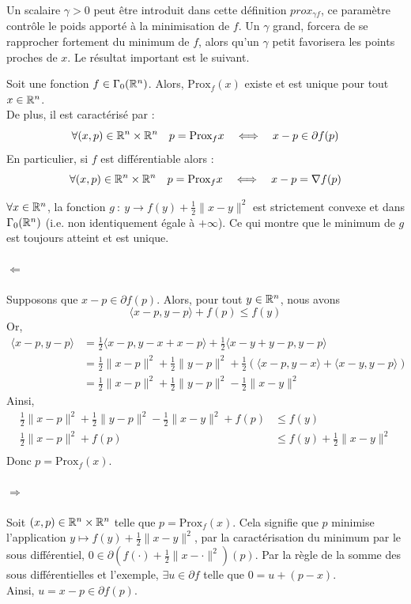 \documentclass[a4paper,12pt]{article}
\newcommand{\prox}{\text{Prox}}
\begin{document}
Un scalaire $\gamma >0 $ peut être introduit dans cette définition $prox_{\gamma f}$, ce paramètre contrôle le poids apporté à la minimisation de $f$. Un $\gamma$ grand, forcera de se rapprocher fortement du minimum de $f$, alors qu'un $\gamma$ petit favorisera les points proches de $x$. Le résultat important est le suivant. 
\begin{propriete}
Soit une fonction $f\in\Gamma_0(\mathbb{R}^n)$. Alors, $\prox_f(x)$ existe et est unique pour tout $x\in\mathbb{R}^n$.\\
De plus, il est caractérisé par : 
$$
\forall (x,p)\in \RR^n\times\RR^n\quad p=\prox_fx\quad\Longleftrightarrow\quad x-p\in\partial f(p)
$$
En particulier, si $f$ est différentiable alors : 
$$
\forall (x,p)\in \RR^n\times\RR^n\quad p=\prox_fx\quad \Longleftrightarrow \quad x-p=\nabla f(p)
$$
\end{propriete}
\begin{preuve}
$\forall x \in \mathbb{R}^n$, la fonction $g\ :\ y \rightarrow f(y) +\frac{1}{2}\|x-y\|^2$ est strictement convexe et dans $\Gamma_0(\mathbb{R}^n)$ (i.e. non identiquement égale à $+\infty$). Ce qui montre que le minimum de $g$ est toujours atteint et est unique. 


\paragraph{$\Leftarrow$} Supposons que $x-p\in\partial f(p)$. Alors, pour tout $y\in\mathbb{R}^n$, nous avons 
$$
\langle x-p,y-p\rangle +f(p) \leq f(y)
$$
Or,
\begin{align*}
\langle x-p,y-p\rangle &= \frac{1}{2}\langle x-p,y-x+x-p\rangle + \frac{1}{2}\langle  x-y+y-p,y-p\rangle\\
&=\frac{1}{2} \|x-p\|^2 + \frac{1}{2}\|y-p \|^2 +\frac{1}{2}\left( \langle x-p,y-x\rangle + \langle x-y,y-p\rangle\right)\\
&= \frac{1}{2} \|x-p\|^2 + \frac{1}{2}\|y-p \|^2 -\frac{1}{2}\|x-y\|^2
\end{align*}
Ainsi,
\begin{align*}
\frac{1}{2} \|x-p\|^2 + \frac{1}{2}\|y-p \|^2 -\frac{1}{2}\|x-y\|^2 + f(p) &\leq f(y) \\
\frac{1}{2} \|x-p\|^2 + f(p) &\leq f(y) + \frac{1}{2}\|x-y\|^2\\
\end{align*}
Donc $p=\prox_f(x)$.
\paragraph{$\Rightarrow$} Soit $(x,p)\in \mathbb{R}^n\times\mathbb{R}^n$ telle que $p=\prox_f(x)$. Cela signifie que $p$ minimise l'application $y\mapsto f(y)+\frac{1}{2}\|x-y\|^2$, par la caractérisation du minimum par le sous différentiel, $0\in\partial \left(f(\cdot)+\frac{1}{2}\|x-\cdot\|^2 \right)(p)$. Par la règle de la somme des sous différentielles et l'exemple, $\exists u\in\partial f$ telle que $0=u+(p-x)$. \\
Ainsi, $u=x-p\in\partial f(p)$. 
\end{preuve}
 
\end{document}
